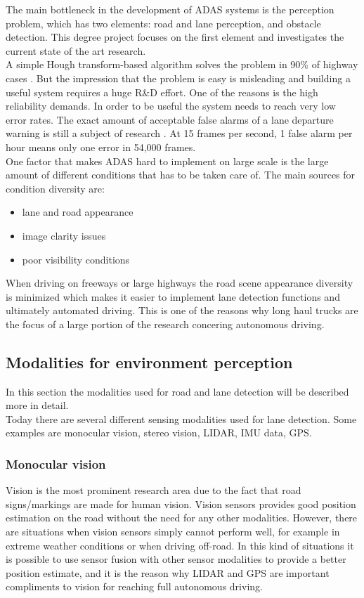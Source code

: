 The main bottleneck in the development of ADAS systems is the perception problem, which has two elements: road and lane perception, and obstacle detection. This degree project focuses on the first element and investigates the current state of the art research.\\

A simple Hough transform-based algorithm solves the problem in 90\% of highway cases \cite{BarHillel2014}. 
But the impression that the problem is easy is misleading and building a useful system requires a huge R\&{D} effort. One of the reasons is the high reliability demands. In order to be useful the system needs to reach very low error rates. The exact amount of acceptable false alarms of a lane departure warning is still a subject of research \cite{BarHillel2014}. At 15 frames per second, 1 false alarm per hour means only one error in 54,000 frames.\\

One factor that makes ADAS hard to implement on large scale is the large amount of different conditions that has to be taken care of. The main sources for condition diversity are:
\begin{itemize}  
\item lane and road appearance
\item image clarity issues
\item poor visibility conditions
\end{itemize}

When driving on freeways or large highways the road scene appearance diversity is minimized which makes it easier to implement lane detection functions and ultimately automated driving. This is one of the reasons why long haul trucks are the focus of a large portion of the research concering autonomous driving. 

\subsection{Modalities for environment perception}
In this section the modalities used for road and lane detection will be described more in detail.\\

Today there are several different sensing modalities used for lane detection. Some examples are monocular vision, stereo vision, LIDAR, IMU data, GPS.

\subsubsection{Monocular vision}
Vision is the most prominent research area due to the fact that road signs/markings are made for human vision. Vision sensors provides good position estimation on the road without the need for any other modalities. However, there are situations when vision sensors simply cannot perform well, for example in extreme weather conditions or when driving off-road. In this kind of situations it is possible to use sensor fusion with other sensor modalities to provide a better position estimate, and it is the reason why LIDAR and GPS are important compliments to vision for reaching full autonomous driving.\\

